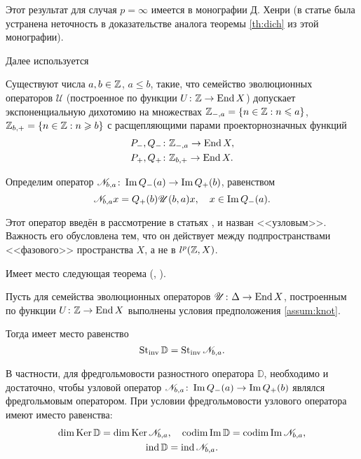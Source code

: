 Этот результат для случая $p=\infty$ имеется в монографии Д. Хенри \cite{henri} (в статье \cite{BasPas01} была устранена неточность в доказательстве аналога теоремы \ref{th:dich} из этой монографии).

Далее используется
\begin{assumption}\label{assum:knot}
    Существуют числа $a, b \in \mathbb{Z}$, $a \leq b$, такие, что семейство эволюционных операторов $\mathcal U$ (построенное по функции $U\colon \mathbb{Z} \to \operatorname{End} X$) допускает экспоненциальную дихотомию на множествах $\mathbb{Z}_{-, a} = \left\{n \in \mathbb{Z} : n \leqslant a\right\}$, $\mathbb{Z}_{b,+} = \left\{n \in \mathbb{Z} : n \geqslant b\right\}$ с расщепляющими парами проекторнозначных функций
    \begin{align*}
        P_{-}, Q_{-} &\colon \mathbb{Z}_{-,a} \to \operatorname{End} X,\\
        P_{+}, Q_{+} &\colon \mathbb{Z}_{b,+} \to \operatorname{End} X.
    \end{align*}
\end{assumption}

Определим оператор $\mathcal N_{b, a} \colon \operatorname{Im} Q_{-}(a) \to \operatorname{Im} Q_{+}(b)$, равенством
\[ \mathcal N_{b, a} x = Q_{+}(b) \mathcal U(b, a) x, \quad x \in \operatorname{Im} Q_{-}(a).\]

Этот оператор введён в рассмотрение в статьях \cite{Bas00}, \cite{Bas13} и назван <<узловым>>. Важность его обусловлена тем, что он действует между подпространствами <<фазового>> пространства $X$, а не в $l^p(\mathbb{Z}, X)$.

Имеет место следующая теорема (\cite{Bas00}, \cite{Bas13}).
\begin{theorem}\label{th:knot_stinv}
    Пусть для семейства эволюционных операторов $\mathcal U \colon \Delta \to \operatorname{End} X$, построенным по функции $U\colon \mathbb{Z} \to \operatorname{End} X$ выполнены условия предположения \ref{assum:knot}.

    Тогда имеет место равенство
    \[ \operatorname{St_{inv}}{\mathbb D} = \operatorname{St_{inv}}{\mathcal N_{b, a}}.\]

    В частности, для фредгольмовости разностного оператора $\mathbb D$, необходимо и достаточно, чтобы узловой оператор $\mathcal N_{b, a} \colon \operatorname{Im} Q_{-}(a) \to \operatorname{Im} Q_{+}(b)$ являлся фредгольмовым оператором. При условии фредгольмовости узлового оператора имеют иместо равенства:
    \begin{gather*}
        \dim \operatorname{Ker} \mathbb D = \dim \operatorname{Ker} \mathcal N_{b, a}, \quad
        \operatorname{codim} \operatorname{Im} \mathbb D = \operatorname{codim} \operatorname{Im} \mathcal N_{b, a}, \\
        \operatorname{ind} \mathbb D = \operatorname{ind} \mathcal N_{b, a}.
    \end{gather*}
\end{theorem}

